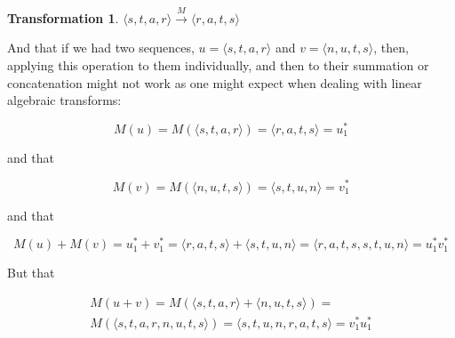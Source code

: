 \documentclass[a4paper, 18pt]{book} %
\newtheorem{trans}{Transformation}
\begin{document}
\begin{appendices}
\vspace{2em}

\begin{trans}
$\langle s, t, a, r \rangle \xrightarrow{M} \langle r, a, t, s \rangle$
\end{trans}

\vspace{2em}

And that if we had two sequences, $u = \langle s, t, a, r \rangle$ and $v = \langle n, u, t, s  \rangle$, then, applying this operation to them individually, and then to their summation or concatenation might not work as one might expect when dealing with linear algebraic transforms:

\vspace{2em}


\begin{equation}
M(u) = M(\langle s, t, a, r \rangle) = \langle r, a, t, s \rangle = u^*_1
\end{equation}

\vspace{2em}

and that

\vspace{2em}

\begin{equation}
M(v) = M(\langle n, u, t, s  \rangle) = \langle s, t, u, n \rangle = v^*_1
\end{equation}

\vspace{2em}

and that

\vspace{2em}

\begin{equation}
M(u) + M(v) = u^*_1 + v^*_1 = \langle r, a, t, s \rangle + \langle s, t, u, n \rangle = \langle r, a, t, s, s, t, u, n \rangle = u^*_1v^*_1
\end{equation}

\vspace{2em}

But that

\vspace{2em}


\begin{multline}
M(u + v) = M(\langle s, t, a, r \rangle + \langle n, u, t, s  \rangle) =\\ 
 M(\langle s, t, a, r, n, u, t, s  \rangle) = \langle s ,t ,u ,n ,r ,a ,t ,s \rangle = v^*_1u^*_1
\end{multline}


\end{appendices}
\end{document}
